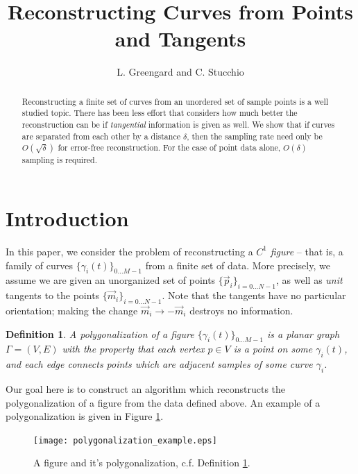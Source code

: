 \documentclass{article}
\newtheorem{definition}[cntr]{Definition}
\numberwithin{cntr}{section}
\numberwithin{equation}{section}
\newcommand{\vp}[0]{{\vec{p}}}
\newcommand{\vm}[0]{{\vec{m}}}
\newcommand{\Oto}[1]{{0 \ldots #1-1}}
\newcommand{\OtoN}{{0 \ldots N-1}}
\newcommand{\pointData}{{ \{ \vp_{i} \}_{i=\OtoN} }}
\newcommand{\tanData}{{ \{ \vm_{i} \}_{i=\OtoN} }}
\newcommand{\curveSet}{{ \{ \gamma_i(t) \}_{\Oto{M}}}}
\newcommand{\curvesep}{{\delta}}
\begin{document}
\title{Reconstructing Curves from Points and Tangents}

\author{L. Greengard and C. Stucchio}

\maketitle

\begin{abstract}
Reconstructing a finite set of curves from an unordered set of sample points
is a well studied topic. There has been less
effort that considers how much better the reconstruction can be if
\emph{tangential} information is given as well.
We show that if curves are separated from each other by a
distance $\curvesep$, then the sampling rate need only be $O(\sqrt{\curvesep})$
for error-free reconstruction.
For the case of point data alone, $O(\curvesep)$ sampling is required.
\end{abstract}

\section{Introduction}

In this paper, we consider the problem of reconstructing a
$C^{1}$ \emph{figure} -- that is, a family of curves $\curveSet$ from a finite
set of data. More precisely, we assume we are given
an unorganized set of points $\pointData$, as well as \emph{unit} tangents to the points $\tanData$. Note that the tangents have no particular orientation; making the change $\vm_{i} \rightarrow -\vm_{i}$ destroys no information.

\begin{definition}
  \label{def:polygonalization}
  A polygonalization of a figure $\curveSet$ is a planar graph
$\Gamma = (V,E)$ with the property that each vertex $p \in V$ is a point on some $\gamma_{i}(t)$, and each edge connects points which are adjacent samples of some curve $\gamma_{i}$.
\end{definition}

Our goal here is to construct an algorithm which reconstructs the
polygonalization of a figure from the data defined above.
An example of a polygonalization is given in Figure \ref{fig:polygonalization}.

\begin{figure}
\setlength{\unitlength}{0.240900pt}
\ifx\plotpoint\undefined\newsavebox{\plotpoint}\fi
\sbox{\plotpoint}{\rule[-0.200pt]{0.400pt}{0.400pt}}%
\texttt{[image: polygonalization\_example.eps]}
\caption{A figure and it's polygonalization, c.f. Definition \ref{def:polygonalization}. }
\label{fig:polygonalization}
\end{figure}
\end{document}
